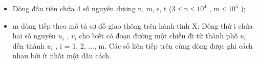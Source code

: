 \begin{itemize}
	\item Dòng đầu tiên chứa 4 số nguyên dương n, m, s, t (3 ≤ n ≤ $10^{4}$ , m ≤ $10^{5}$ );
	\item m dòng tiếp theo mô tả sơ đồ giao thông trên hành tinh X: Dòng thứ i chứa hai số nguyên $u_{i}$ , $v_{i}$ cho biết có đoạn đường một chiều đi từ thành phố $u_{i}$ đến thành $u_{i}$ , i = 1, 2, ..., m. Các số liên tiếp trên cùng dòng được ghi cách nhau bởi ít nhất một dấu cách.
\end{itemize}